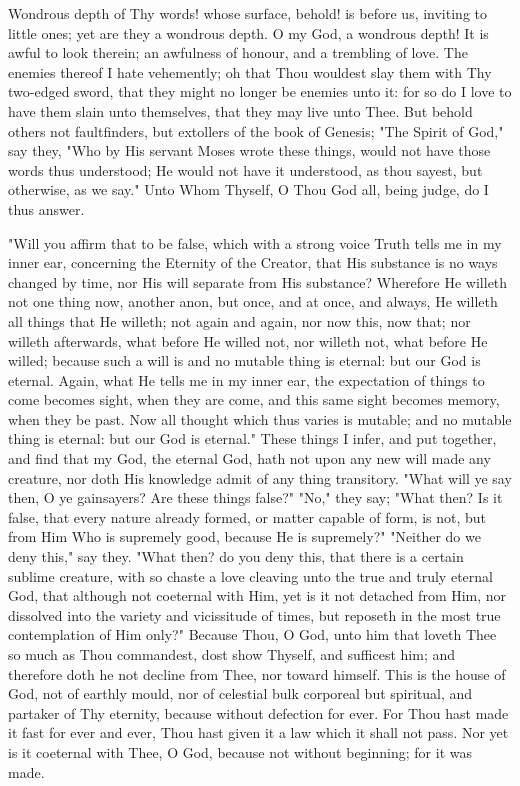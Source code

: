 \documentclass[b5paper,openright,12pt,twoside]{book}
\begin{document}
Wondrous depth of Thy words! whose surface, behold! is before us,
inviting to little ones; yet are they a wondrous depth. O my God, a
wondrous depth! It is awful to look therein; an awfulness of honour, and
a trembling of love. The enemies thereof I hate vehemently; oh that Thou
wouldest slay them with Thy two-edged sword, that they might no longer
be enemies unto it: for so do I love to have them slain unto themselves,
that they may live unto Thee. But behold others not faultfinders, but
extollers of the book of Genesis; "The Spirit of God," say they, "Who
by His servant Moses wrote these things, would not have those words
thus understood; He would not have it understood, as thou sayest, but
otherwise, as we say." Unto Whom Thyself, O Thou God all, being judge,
do I thus answer.

"Will you affirm that to be false, which with a strong voice Truth tells
me in my inner ear, concerning the Eternity of the Creator, that His
substance is no ways changed by time, nor His will separate from His
substance? Wherefore He willeth not one thing now, another anon, but
once, and at once, and always, He willeth all things that He willeth;
not again and again, nor now this, now that; nor willeth afterwards,
what before He willed not, nor willeth not, what before He willed;
because such a will is and no mutable thing is eternal: but our God is
eternal. Again, what He tells me in my inner ear, the expectation of
things to come becomes sight, when they are come, and this same sight
becomes memory, when they be past. Now all thought which thus varies is
mutable; and no mutable thing is eternal: but our God is eternal." These
things I infer, and put together, and find that my God, the eternal God,
hath not upon any new will made any creature, nor doth His knowledge
admit of any thing transitory. "What will ye say then, O ye gainsayers?
Are these things false?" "No," they say; "What then? Is it false, that
every nature already formed, or matter capable of form, is not, but from
Him Who is supremely good, because He is supremely?" "Neither do we deny
this," say they. "What then? do you deny this, that there is a certain
sublime creature, with so chaste a love cleaving unto the true and
truly eternal God, that although not coeternal with Him, yet is it not
detached from Him, nor dissolved into the variety and vicissitude of
times, but reposeth in the most true contemplation of Him only?" Because
Thou, O God, unto him that loveth Thee so much as Thou commandest, dost
show Thyself, and sufficest him; and therefore doth he not decline
from Thee, nor toward himself. This is the house of God, not of earthly
mould, nor of celestial bulk corporeal but spiritual, and partaker of
Thy eternity, because without defection for ever. For Thou hast made
it fast for ever and ever, Thou hast given it a law which it shall not
pass. Nor yet is it coeternal with Thee, O God, because not without
beginning; for it was made.
\end{document}
